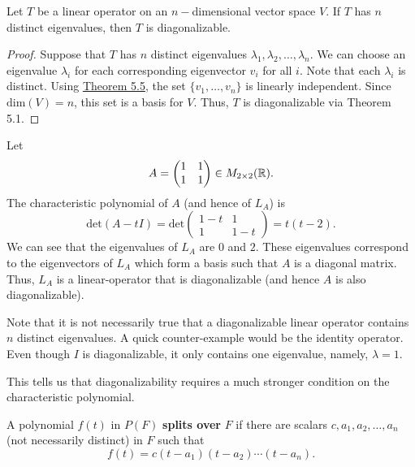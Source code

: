 \begin{corollary}
  Let \( T  \) be a linear operator on an \( n- \)dimensional  vector space \( V  \). If \( T  \) has \( n  \) distinct eigenvalues, then \( T  \) is diagonalizable.  
\end{corollary}
\begin{proof}
Suppose that \( T  \) has \( n  \) distinct eigenvalues \( {\lambda}_{1}, {\lambda}_{2}, \dots, {\lambda}_{n} \). We can choose an eigenvalue \( {\lambda}_{i} \) for each corresponding eigenvector \( {v}_{i} \) for all \( i  \). Note that each \( {\lambda}_{i} \) is distinct. Using {\hyperref[Theorem 5.5]{Theorem 5.5}}, the set \( \{ {v}_{1}, \dots, {v}_{n} \}  \) is linearly independent. Since \( \text{dim}(V) = n  \), this set is a basis for \( V  \). Thus, \( T  \) is diagonalizable via Theorem 5.1. 
\end{proof}

\begin{eg}
   Let  
   \[  A = \begin{pmatrix} 
       1 & 1 \\
       1 & 1 
             \end{pmatrix}  \in {M}_{2 \times 2}(\mathbb{R}). \]
    The characteristic polynomial of \( A  \) (and hence of \( {L}_{A} \)) is
    \[  \text{det}(A - t I ) = \text{det} \begin{pmatrix} 
        1 - t & 1 \\
        1 & 1 - t 
              \end{pmatrix}  = t (t-2). \]
        We can see that the eigenvalues of \( {L}_{A} \) are \( 0  \) and \( 2 \). These eigenvalues correspond to the eigenvectors of \( {L}_{A} \) which form a basis such that \( A  \) is a diagonal matrix. Thus, \( {L}_{A} \) is a linear-operator that is diagonalizable (and hence \( A  \) is also diagonalizable).
\end{eg}

Note that it is not necessarily true that a diagonalizable linear operator contains \( n  \) distinct eigenvalues. A quick counter-example would be the identity operator. Even though \( I  \) is diagonalizable, it only contains one eigenvalue, namely, \( \lambda = 1  \).

This tells us that diagonalizability requires a much stronger condition on the characteristic polynomial.

\begin{definition}
   A polynomial \( f(t)  \) in \( P(F)  \) \textbf{splits over} \( F  \) if there are scalars \( c, {a}_{1}, {a}_{2}, \dots, {a}_{n} \) (not necessarily distinct) in \( F  \) such that 
   \[  f(t) = c(t- {a}_{1})(t - {a}_{2})\cdots (t - {a}_{n}). \]
\end{definition}

